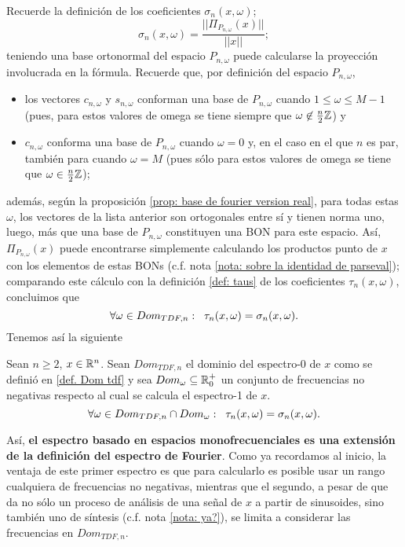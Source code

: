 Recuerde la definición de los coeficientes
$\sigma_{n}(x, \omega)$;
\[
\sigma_{n}(x, \omega) = \frac{|| \Pi_{P_{n, \omega}}(x) ||}{|| x ||};
\]
teniendo una base ortonormal del espacio 
$P_{n, \omega}$ puede calcularse la proyección involucrada en la fórmula.
Recuerde que, por definición del espacio $P_{n, \omega}$,
\begin{itemize}
	\item los vectores $c_{n, \omega}$ y $s_{n, \omega}$ conforman
	una base de $P_{n, \omega}$ cuando $1 \leq \omega \leq M-1$ 
	(pues, para estos valores de omega se tiene siempre
	que $\omega \not\in \frac{n}{2} \mathbb{Z}$) y
	\item $c_{n, \omega}$ conforma una base 
	de $P_{n, \omega}$ cuando $\omega = 0$ y,
	en el caso en el que $n$ es par, también para cuando $\omega = M$
	(pues sólo para estos valores de omega se tiene 
	que $\omega \in \frac{n}{2} \mathbb{Z}$);
\end{itemize}
además, según la proposición
\ref{prop: base de fourier version real},
para todas estas $\omega$,
los vectores de la lista anterior son ortogonales entre
sí y tienen norma uno, luego, más que una base de 
$P_{n, \omega}$ constituyen una BON para este espacio.
Así, $\Pi_{P_{n, \omega}}(x)$ puede encontrarse 
simplemente calculando los productos punto 
de $x$ con los elementos de estas BONs (c.f. 
nota \ref{nota: sobre la identidad de parseval});
comparando este cálculo con la definición 
\ref{def: taus}
de los coeficientes $\tau_{n}(x, \omega)$, concluimos que
\begin{equation}
\label{eq4: 4May}
\forall \omega \in Dom_{TDF, n}: \hspace{0.2cm}
\tau_{n}(x, \omega) = \sigma_{n}(x, \omega).
\end{equation}
Tenemos así la siguiente

\begin{prop}
\label{prop: coinciden espectr}
Sean $n \geq 2$, $x \in \mathbb{R}^{n}$.
Sean $Dom_{TDF, n}$ el dominio del espectro-0 de $x$
como se definió en \ref{def. Dom tdf} y sea $Dom_{\omega} \subseteq \mathbb{R}^{+}_{0}$
un conjunto de frecuencias no negativas respecto al cual se calcula
el espectro-1 de $x$.
\[
\forall \omega \in Dom_{TDF, n} \cap Dom_{\omega}:
\hspace{0.2cm} \tau_{n}(x, \omega) = \sigma_{n}(x, \omega).
\]
\end{prop}

Así, \textbf{el espectro basado en espacios monofrecuenciales
es una extensión de la definición del espectro de Fourier}.
Como ya recordamos al inicio, la
ventaja de este primer espectro es que para calcularlo es posible usar
un rango cualquiera de frecuencias no negativas, mientras que el segundo, 
a pesar de que da no sólo un proceso de análisis de una señal 
de $x$ a partir de sinusoides, sino también uno de síntesis
(c.f. nota \ref{nota: ya?}), se limita a considerar las frecuencias 
en $Dom_{TDF, n}$.

